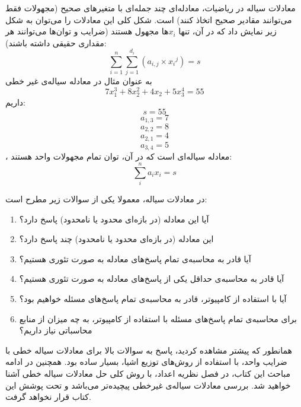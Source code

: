 \begin{EXTRA}{معادلات سیاله}
    \p
    در ریاضیات،
    معادله‌ای چند جمله‌ای با متغیرهای صحیح
    (مجهولات فقط می‌توانند مقادیر صحیح اتخاذ کنند)
    است. شکل کلی این معادلات را می‌توان به شکل زیر نمایش داد
    که در آن، تنها ‌$x_i$ها مجهول هستند
    (ضرایب و توان‌ها می‌توانند هر مقداری حقیقی داشته باشند): 
    $$\sum\limits_{i=1}^{n} \sum\limits_{j=1}^{d_i} ({a_{i,j}} \times {x_i}^{j}) = s$$
    \p
به عنوان مثال در معادله سیاله‌ی غیر خطی 
$$7x_1^3 + 8x_2^2 + 4x_2 + 5x_3^4 = 55$$
داریم:
$$s = 55$$
$$a_{1, 3} = 7$$
$$a_{2, 2} = 8$$
$$a_{2, 1} = 4$$
$$ a_{3, 4} = 5$$
    \p
    ،
    معادله سیاله‌ای است که در آن، توان تمام مجهولات واحد هستند:
    $$\sum\limits_{i}^{n} {a_i} {x_i} = s$$

    \p
        در معادلات سیاله، معمولا یکی از سوالات زیر مطرح است:
        \begin{enumerate}
            \item 
            آیا این معادله (در بازه‌ای محدود یا نامحدود) پاسخ دارد؟
            \item 
            این معادله (در بازه‌ای محدود یا نامحدود) چند پاسخ دارد؟
            \item 
            آیا قادر به محاسبه‌ی تمام پاسخ‌های معادله به صورت تئوری هستیم؟
            \item 
            آیا قادر به محاسبه‌ی حداقل یکی از پاسخ‌های معادله به صورت تئوری هستیم؟
            \item 
            آیا با استفاده از کامپیوتر، قادر به محاسبه‌ی تمام پاسخ‌های مسئله خواهیم بود؟
            \item 
            برای محاسبه‌ی تمام پاسخ‌های مسئله با استفاده از کامپیوتر، به چه میزان از منابع محاسباتی نیاز داریم؟
        \end{enumerate}

    \p
    همانطور که پیشتر مشاهده کردید، پاسخ به سوالات بالا برای معادلات سیاله خطی با ضرایب واحد، با استفاده از
    روش‌های توزیع اشیا، بسیار ساده بود.
    همچنین در ادامه مباحث این کتاب، در فصل نظریه اعداد، با روش کلی حل معادلات سیاله خطی
    آشنا خواهید شد.
    بررسی معادلات سیاله‌ی غیرخطی پیچیده‌تر می‌باشد و تحت پوشش این کتاب قرار نخواهد گرفت.
\end{EXTRA}